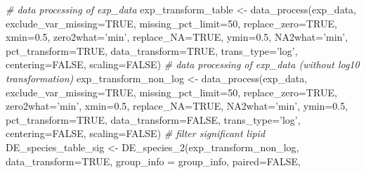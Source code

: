 \documentclass[]{article}
\newcommand{\hlnum}[1]{\textcolor[rgb]{0.816,0.125,0.439}{#1}}%
\newcommand{\hlstr}[1]{\textcolor[rgb]{0.251,0.627,0.251}{#1}}%
\newcommand{\hlcom}[1]{\textcolor[rgb]{0.502,0.502,0.502}{\textit{#1}}}%
\newcommand{\hlstd}[1]{\textcolor[rgb]{0.251,0.251,0.251}{#1}}%
\newcommand{\hlkwc}[1]{\textcolor[rgb]{0.251,0.251,0.251}{#1}}%
\newcommand{\hlkwd}[1]{\textcolor[rgb]{0.878,0.439,0.125}{#1}}%
\newenvironment{Shaded}{\begin{myshaded}}{\end{myshaded}}
\newcommand{\KeywordTok}[1]{\hlkwd{#1}}
\newcommand{\DataTypeTok}[1]{\hlkwc{#1}}
\newcommand{\DecValTok}[1]{\hlnum{#1}}
\newcommand{\FloatTok}[1]{\hlnum{#1}}
\newcommand{\StringTok}[1]{\hlstr{#1}}
\newcommand{\CommentTok}[1]{\hlcom{#1}}
\newcommand{\OtherTok}[1]{{#1}}
\newcommand{\NormalTok}[1]{\hlstd{#1}}
\begin{document}
\begin{Shaded}
\begin{Highlighting}[]
\CommentTok{# data processing of exp_data}
\NormalTok{exp_transform_table <-}\StringTok{ }\KeywordTok{data_process}\NormalTok{(exp_data, }\DataTypeTok{exclude_var_missing=}\OtherTok{TRUE}\NormalTok{,}
                                    \DataTypeTok{missing_pct_limit=}\DecValTok{50}\NormalTok{, }
                                    \DataTypeTok{replace_zero=}\OtherTok{TRUE}\NormalTok{, }\DataTypeTok{xmin=}\FloatTok{0.5}\NormalTok{, }
                                    \DataTypeTok{zero2what=}\StringTok{'min'}\NormalTok{, }\DataTypeTok{replace_NA=}\OtherTok{TRUE}\NormalTok{,}
                                    \DataTypeTok{ymin=}\FloatTok{0.5}\NormalTok{, }\DataTypeTok{NA2what=}\StringTok{'min'}\NormalTok{, }
                                    \DataTypeTok{pct_transform=}\OtherTok{TRUE}\NormalTok{,}
                                    \DataTypeTok{data_transform=}\OtherTok{TRUE}\NormalTok{, }\DataTypeTok{trans_type=}\StringTok{'log'}\NormalTok{,}
                                    \DataTypeTok{centering=}\OtherTok{FALSE}\NormalTok{, }\DataTypeTok{scaling=}\OtherTok{FALSE}\NormalTok{)}
\CommentTok{# data processing of exp_data (without log10 transformation)}
\NormalTok{exp_transform_non_log <-}\StringTok{ }\KeywordTok{data_process}\NormalTok{(exp_data, }\DataTypeTok{exclude_var_missing=}\OtherTok{TRUE}\NormalTok{,}
                                      \DataTypeTok{missing_pct_limit=}\DecValTok{50}\NormalTok{, }\DataTypeTok{replace_zero=}\OtherTok{TRUE}\NormalTok{,}
                                      \DataTypeTok{zero2what=}\StringTok{'min'}\NormalTok{, }\DataTypeTok{xmin=}\FloatTok{0.5}\NormalTok{,}
                                      \DataTypeTok{replace_NA=}\OtherTok{TRUE}\NormalTok{, }\DataTypeTok{NA2what=}\StringTok{'min'}\NormalTok{,}
                                      \DataTypeTok{ymin=}\FloatTok{0.5}\NormalTok{, }\DataTypeTok{pct_transform=}\OtherTok{TRUE}\NormalTok{,}
                                      \DataTypeTok{data_transform=}\OtherTok{FALSE}\NormalTok{, }\DataTypeTok{trans_type=}\StringTok{'log'}\NormalTok{,}
                                      \DataTypeTok{centering=}\OtherTok{FALSE}\NormalTok{, }\DataTypeTok{scaling=}\OtherTok{FALSE}\NormalTok{)}
\CommentTok{# filter significant lipid}
\NormalTok{DE_species_table_sig <-}\StringTok{ }\KeywordTok{DE_species_2}\NormalTok{(exp_transform_non_log, }
                                     \DataTypeTok{data_transform=}\OtherTok{TRUE}\NormalTok{,}
                                     \DataTypeTok{group_info =}\NormalTok{ group_info, }\DataTypeTok{paired=}\OtherTok{FALSE}\NormalTok{,}

\end{Highlighting}
\end{Shaded}
\end{document}
